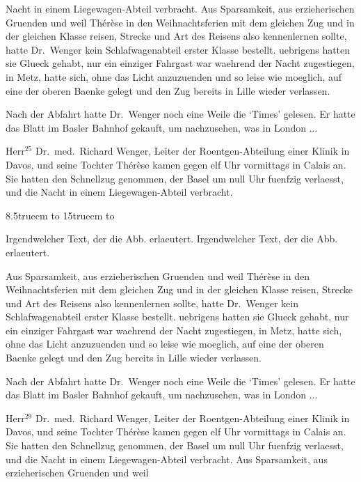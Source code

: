 Nacht in einem Liege\-wagen-Abteil verbracht.
Aus Sparsamkeit, aus erzieherischen
Gruenden und weil
Th\'e\-r\`ese in den Weihnachtsferien mit dem gleichen
Zug und in der gleichen Klasse reisen, Strecke und
Art des Reisens also kennenlernen sollte, hatte Dr.~Wenger
kein Schlafwagenabteil erster Klasse bestellt.
uebrigens hatten sie Glueck gehabt, nur ein
einziger Fahrgast war waehrend der Nacht zugestiegen,
in Metz, hatte sich, ohne das Licht anzuzuenden
und so leise wie moeglich, auf eine der oberen
Baenke gelegt und den Zug bereits in Lille wieder
verlassen.\par
Nach der Abfahrt hatte Dr.~Wen\-ger noch eine
Weile die `Times' gelesen. Er hatte das Blatt im
Basler Bahnhof gekauft, um nachzusehen, was in London ...\par
Herr$^{25}$ Dr.~med.~Richard Wenger, Leiter der Roent\-gen-Ab\-tei\-lung
einer Klinik in Davos, und seine
Tochter Th\'e\-r\`ese kamen gegen elf Uhr vormittags
in Calais an. Sie hatten den Schnellzug genommen,
der Basel um null Uhr fuenfzig verlaesst, und die
Nacht in einem Liege\-wagen-Abteil verbracht.\par
\begin{floatingfigure}{8.5truecm}%
\vbox to 15truecm%
{\vfil\hbox to \vfil}%
\caption{Irgendwelcher Text, der die Abb. erlaeutert.
Irgendwelcher Text, der die Abb. erlaeutert.}
\end{floatingfigure}
%
Aus Sparsamkeit, aus erzieherischen
Gruenden und weil
Th\'e\-r\`ese in den Weihnachtsferien mit dem gleichen
Zug und in der gleichen Klasse reisen, Strecke und
Art des Reisens also kennenlernen sollte, hatte Dr.~Wenger
kein Schlafwagenabteil erster Klasse bestellt.
uebrigens hatten sie Glueck gehabt, nur ein
einziger Fahrgast war waehrend der Nacht zugestiegen,
in Metz, hatte sich, ohne das Licht anzuzuenden
und so leise wie moeglich, auf eine der oberen
Baenke gelegt und den Zug bereits in Lille wieder
verlassen.\par
Nach der Abfahrt hatte Dr.~Wen\-ger noch eine
Weile die `Times' gelesen. Er hatte das Blatt im
Basler Bahnhof gekauft, um nachzusehen, was in London ...\par
Herr$^{29}$ Dr.~med.~Richard Wenger, Leiter der Roent\-gen-Ab\-tei\-lung
einer Klinik in Davos, und seine
Tochter Th\'e\-r\`ese kamen gegen elf Uhr vormittags
in Calais an. Sie hatten den Schnellzug genommen,
der Basel um null Uhr fuenfzig verlaesst, und die
Nacht in einem Liege\-wagen-Abteil verbracht.
Aus Sparsamkeit, aus erzieherischen
Gruenden und weil
